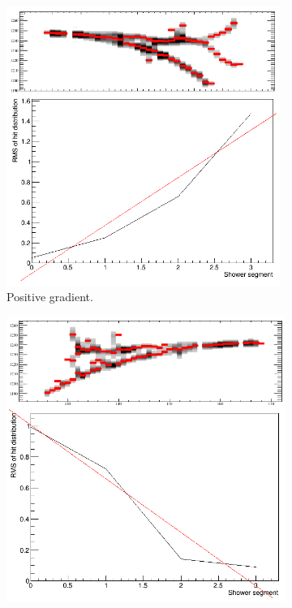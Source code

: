\begin{figure}
  \centering
  \begin{subfigure}[t]{0.48\linewidth}
    \centering
    \includegraphics[width=0.98\textwidth]{ShowerReconDirectionPositive.png}
    \caption{Positive gradient.}
    \label{fig:EMShowerOrientationPositive}
  \end{subfigure}
  \hfill
  \begin{subfigure}[t]{0.48\linewidth}
    \centering
    \includegraphics[width=0.98\linewidth]{ShowerReconDirectionNegative.png}

\end{subfigure}
\end{figure}
